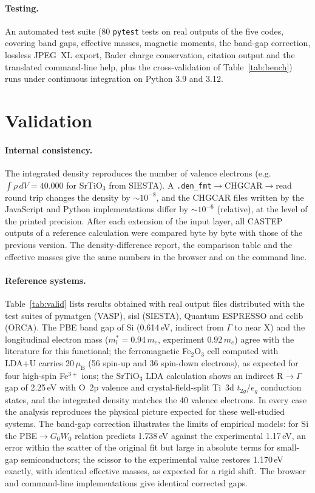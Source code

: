 \documentclass[11pt,a4paper]{article}
\newcommand{\code}[1]{\texttt{#1}}
\begin{document}
\paragraph{Testing.} An automated test suite (80 \code{pytest} tests on real outputs of the five codes, covering band gaps, effective masses, magnetic moments, the band-gap correction, lossless JPEG~XL export, Bader charge conservation, citation output and the translated command-line help, plus the cross-validation of Table~\ref{tab:bench}) runs under continuous integration on Python 3.9 and 3.12.

\section{Validation}\label{sec:valid}
\paragraph{Internal consistency.} The integrated density reproduces the number of valence electrons (e.g.\ $\int\rho\,dV=40.000$ for SrTiO$_3$ from SIESTA). A \code{.den\_fmt}$\to$CHGCAR$\to$read round trip changes the density by $\sim10^{-8}$, and the CHGCAR files written by the JavaScript and Python implementations differ by $\sim10^{-6}$ (relative), at the level of the printed precision. After each extension of the input layer, all CASTEP outputs of a reference calculation were compared byte by byte with those of the previous version. The density-difference report, the comparison table and the effective masses give the same numbers in the browser and on the command line.

\paragraph{Reference systems.} Table~\ref{tab:valid} lists results obtained with real output files distributed with the test suites of pymatgen (VASP), sisl (SIESTA), Quantum ESPRESSO and cclib (ORCA). The PBE band gap of Si (0.614\,eV, indirect from $\Gamma$ to near X) and the longitudinal electron mass ($m^*_l=0.94\,m_e$, experiment $0.92\,m_e$) agree with the literature for this functional; the ferromagnetic Fe$_2$O$_3$ cell computed with LDA+U carries 20\,$\mu_\mathrm B$ (56 spin-up and 36 spin-down electrons), as expected for four high-spin Fe$^{3+}$ ions; the SrTiO$_3$ LDA calculation shows an indirect R$\to\Gamma$ gap of 2.25\,eV with O~2p valence and crystal-field-split Ti~3d $t_{2g}/e_g$ conduction states, and the integrated density matches the 40 valence electrons. In every case the analysis reproduces the physical picture expected for these well-studied systems. The band-gap correction illustrates the limits of empirical models: for Si the PBE$\to G_0W_0$ relation predicts 1.738\,eV against the experimental 1.17\,eV, an error within the scatter of the original fit but large in absolute terms for small-gap semiconductors; the scissor to the experimental value restores 1.170\,eV exactly, with identical effective masses, as expected for a rigid shift. The browser and command-line implementations give identical corrected gaps.
\end{document}
